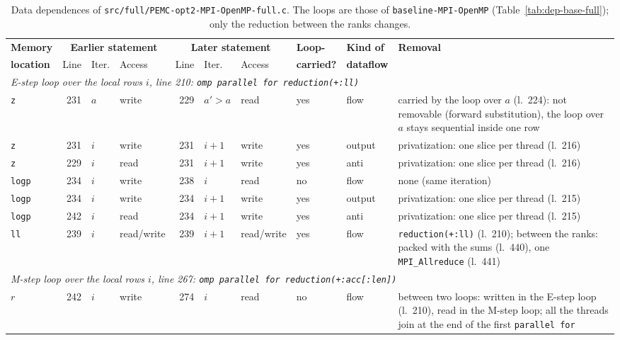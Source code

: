 \documentclass[conference,onecolumn]{IEEEtran}
\newcommand{\vbase}{\texttt{baseline-\allowbreak MPI-\allowbreak OpenMP}}
\begin{document}
\begin{table}[H]
\centering
\caption{Data dependences of \texttt{src/full/PEMC-opt2-MPI-OpenMP-full.c}. The loops are those of \vbase{} (Table~\ref{tab:dep-base-full}); only the reduction between the ranks changes.}\label{tab:dep-opt2-full}
\scriptsize
\setlength{\tabcolsep}{3pt}
\begin{tabular}{lrllrllllp{}}
\toprule
\textbf{Memory} & \multicolumn{3}{c}{\textbf{Earlier statement}} & \multicolumn{3}{c}{\textbf{Later statement}} & \textbf{Loop-} & \textbf{Kind of} & \textbf{Removal} \\
\cmidrule(lr){2-4} \cmidrule(lr){5-7}
\textbf{location} & Line & Iter. & Access & Line & Iter. & Access & \textbf{carried?} & \textbf{dataflow} & \\
\midrule
\multicolumn{10}{p{0.92\textwidth}}{\emph{E-step loop over the local rows $i$, line 210: \texttt{omp parallel for reduction(+:ll)}}} \\
\texttt{z} & 231 & $a$ & write & 229 & $a'>a$ & read & yes & flow & carried by the loop over $a$ (l.~224): not removable (forward substitution), the loop over $a$ stays sequential inside one row \\
\texttt{z} & 231 & $i$ & write & 231 & $i+1$ & write & yes & output & privatization: one slice per thread (l.~216) \\
\texttt{z} & 229 & $i$ & read & 231 & $i+1$ & write & yes & anti & privatization: one slice per thread (l.~216) \\
\texttt{logp} & 234 & $i$ & write & 238 & $i$ & read & no & flow & none (same iteration) \\
\texttt{logp} & 234 & $i$ & write & 234 & $i+1$ & write & yes & output & privatization: one slice per thread (l.~215) \\
\texttt{logp} & 242 & $i$ & read & 234 & $i+1$ & write & yes & anti & privatization: one slice per thread (l.~215) \\
\texttt{ll} & 239 & $i$ & read/write & 239 & $i+1$ & read/write & yes & flow & \texttt{reduction(+:ll)} (l.~210); between the ranks: packed with the sums (l.~440), one \texttt{MPI\_Allreduce} (l.~441) \\
\midrule
\multicolumn{10}{p{0.92\textwidth}}{\emph{M-step loop over the local rows $i$, line 267: \texttt{omp parallel for reduction(+:acc[:len])}}} \\
$r$ & 242 & $i$ & write & 274 & $i$ & read & no & flow & between two loops: written in the E-step loop (l.~210), read in the M-step loop; all the threads join at the end of the first \texttt{parallel for} \\

\end{tabular}
\end{table}
\end{document}
